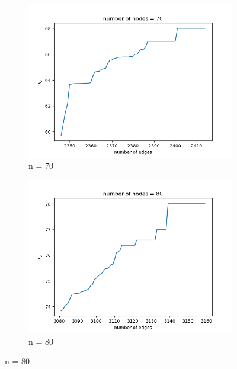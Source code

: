 \documentclass{article}
\begin{document}
\begin{problem}
\begin{figure}[!h]
    \begin{subfigure}{0.35\textwidth}
        \includegraphics[width=\textwidth]{./img/p5_node70.png}
        \caption{n = 70 }
    \end{subfigure}
    \begin{subfigure}{0.35\textwidth}
        \includegraphics[width=\textwidth]{./img/p5_node80.png}
        \caption{n = 80 }
    \end{subfigure}


\end{figure}
\end{problem}
\end{document}
